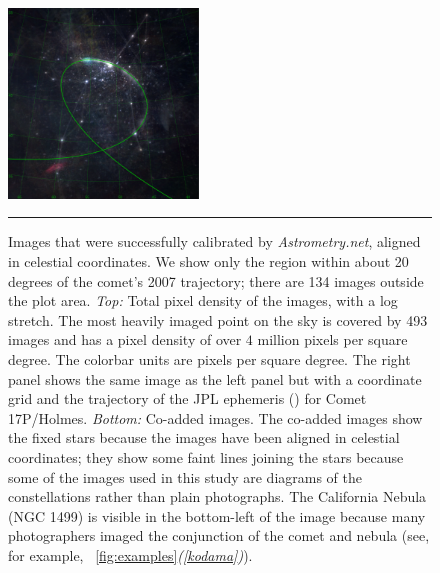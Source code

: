 \documentclass[12pt,preprint]{aastex}
\newcommand{\project}[1]{\textsl{#1}}
\newcommand{\An}{\project{Astrometry.net}}
\newcommand{\figref}[1]{\figurename~\ref{#1}}
\newcommand{\tlabel}[1]{\textsl{({#1})}}
\begin{document}
\begin{figure}
\begin{center}
\includegraphics[width=0.45\textwidth]{holmes-coadd-2.pdf}\hspace{1pt}%
\rule{0.0575\textwidth}{0pt}
\end{center}
\caption[footprints]{Images that were successfully calibrated by \An,
  aligned in celestial coordinates.  We show only the region within
  about 20 degrees of the comet's 2007 trajectory; there are 134
  images outside the plot area.  \textsl{Top:} Total pixel density of
  the images, with a log stretch.  The most heavily imaged point on
  the sky is covered by 493 images and has a pixel density of over $4$
  million pixels per square degree.  The colorbar units are pixels per
  square degree.  The right panel shows the same image as the left
  panel but with a coordinate grid and the trajectory of the JPL
  ephemeris (\citealt{jpl}) for Comet 17P/Holmes.  \textsl{Bottom:}
  Co-added images.  The co-added images show the fixed stars because
  the images have been aligned in celestial coordinates; they show
  some faint lines joining the stars because some of the images used
  in this study are diagrams of the constellations rather than plain
  photographs.  The California Nebula (NGC 1499) is visible in the
  bottom-left of the image because many photographers imaged the
  conjunction of the comet and nebula (see, for example,
  \figref{fig:examples}\tlabel{\ref{kodama}}).\label{fig:footprints}}
\end{figure}
\end{document}

